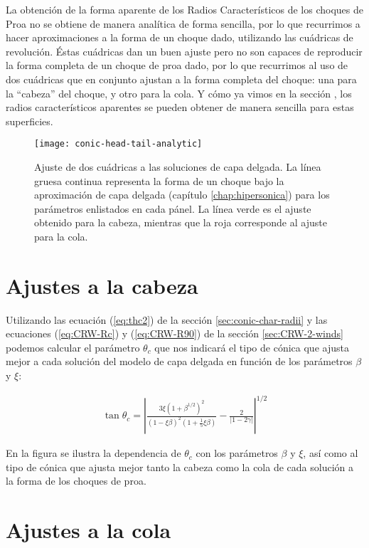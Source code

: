 La obtención de la forma aparente de los Radios Característicos de los choques de Proa
no se obtiene de manera analítica de forma sencilla, por lo que recurrimos a hacer
aproximaciones a la forma de un choque dado, utilizando las cuádricas de revolución.
Éstas cuádricas dan un buen ajuste pero no son capaces de reproducir la forma completa
de un choque de proa dado, por lo que recurrimos al uso de dos cuádricas que en conjunto
ajustan a la forma completa del choque: una para la ``cabeza'' del choque, y otro para la cola.
Y cómo ya vimos en la sección , los radios característicos aparentes se pueden obtener de
manera sencilla para estas superficies.

\begin{figure*}
  \texttt{[image: conic-head-tail-analytic]}
  \label{fig:conic-head-tail-fit}
  \caption{Ajuste de dos cuádricas a las soluciones de capa delgada. La línea gruesa continua
    representa la forma de un choque bajo la aproximación de capa delgada (capítulo
    \ref{chap:hipersonica}) para los parámetros enlistados en cada pánel. La línea verde es el
    ajuste obtenido para la cabeza, mientras que la roja corresponde al ajuste para la cola.}
\end{figure*}


\section{Ajustes a la cabeza}

Utilizando las ecuación (\ref{eq:thc2})  de la sección \ref{sec:conic-char-radii} y las ecuaciones
(\ref{eq:CRW-Rc}) y (\ref{eq:CRW-R90}) de la sección \ref{sec:CRW-2-winds} podemos calcular el parámetro
$\theta_c$ que nos indicará el tipo de cónica que ajusta mejor a cada solución del modelo de capa delgada
en función de los parámetros $\beta$ y $\xi$: 

 \begin{align}
   \tan\theta_c = \left|\frac{3\xi\left(1 + \beta^{1/2}\right)^2}{\left(1 - \xi\beta\right)^2
   \left(1 + \frac{1}{5}\xi\beta\right)} - \frac{2}{\left|1 - 2\gamma\right|}\right|^{1/2}
 \end{align}

 En la figura  se ilustra la dependencia de $\theta_c$ con los parámetros $\beta$ y $\xi$, así como al tipo de
 cónica que ajusta mejor tanto la cabeza como la cola de cada solución a la forma de los choques de proa.
 
 \section{Ajustes a la cola}

